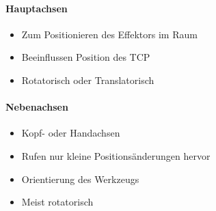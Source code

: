 \paragraph{Hauptachsen}
\begin{itemize}
	\item Zum Positionieren des Effektors im Raum
	\item Beeinflussen Position des TCP
	\item Rotatorisch oder Translatorisch
\end{itemize}
\paragraph{Nebenachsen}
\begin{itemize}
	\item Kopf- oder Handachsen
	\item Rufen nur kleine Positionsänderungen hervor
	\item Orientierung des Werkzeugs
	\item Meist rotatorisch
\end{itemize}